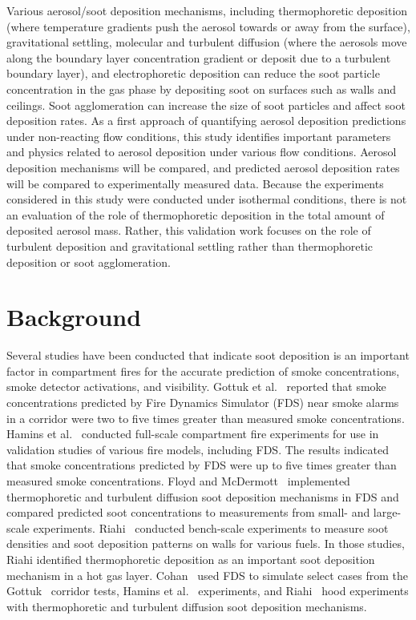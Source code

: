 Various aerosol/soot deposition mechanisms, including thermophoretic deposition (where temperature gradients push the aerosol towards or away from the surface), gravitational settling, molecular and turbulent diffusion (where the aerosols move along the boundary layer concentration gradient or deposit due to a turbulent boundary layer), and electrophoretic deposition can reduce the soot particle concentration in the gas phase by depositing soot on surfaces such as walls and ceilings. Soot agglomeration can increase the size of soot particles and affect soot deposition rates. As a first approach of quantifying aerosol deposition predictions under non-reacting flow conditions, this study identifies important parameters and physics related to aerosol deposition under various flow conditions. Aerosol deposition mechanisms will be compared, and predicted aerosol deposition rates will be compared to experimentally measured data. Because the experiments considered in this study were conducted under isothermal conditions, there is not an evaluation of the role of thermophoretic deposition in the total amount of deposited aerosol mass. Rather, this validation work focuses on the role of turbulent deposition and gravitational settling rather than thermophoretic deposition or soot agglomeration.

\section{Background}
\label{sec:Background}

Several studies have been conducted that indicate soot deposition is an important factor in compartment fires for the accurate prediction of smoke concentrations, smoke detector activations, and visibility. Gottuk et al.~\cite{Gottuk:IAFSS2008} reported that smoke concentrations predicted by Fire Dynamics Simulator (FDS) near smoke alarms in a corridor were two to five times greater than measured smoke concentrations. Hamins et al.~\cite{Hamins:SP1013-1} conducted full-scale compartment fire experiments for use in validation studies of various fire models, including FDS. The results indicated that smoke concentrations predicted by FDS were up to five times greater than measured smoke concentrations. Floyd and McDermott~\cite{Floyd:Interflam2010} implemented thermophoretic and turbulent diffusion soot deposition mechanisms in FDS and compared predicted soot concentrations to measurements from small- and large-scale experiments. Riahi~\cite{Riahi:2011} conducted bench-scale experiments to measure soot densities and soot deposition patterns on walls for various fuels. In those studies, Riahi identified thermophoretic deposition as an important soot deposition mechanism in a hot gas layer. Cohan~\cite{Cohan:Masters} used FDS to simulate select cases from the Gottuk~\cite{Gottuk:IAFSS2008} corridor tests, Hamins et al.~\cite{Hamins:SP1013-1} experiments, and Riahi~\cite{Riahi:2011} hood experiments with thermophoretic and turbulent diffusion soot deposition mechanisms.

